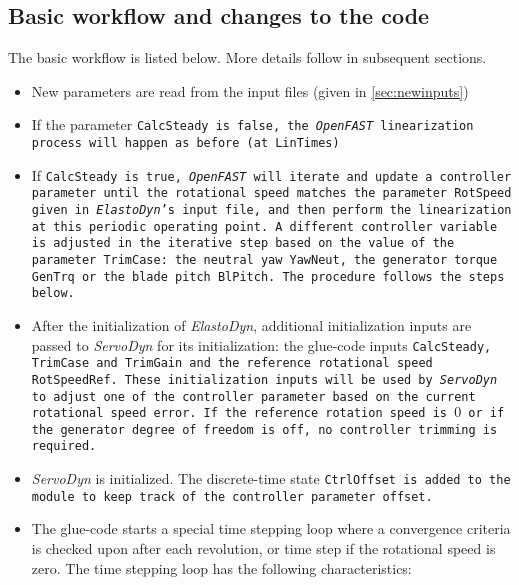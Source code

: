 \documentclass[11pt]{article}
\begin{document}
\subsection{Basic workflow and changes to the code}
The basic workflow is listed below. More details follow in subsequent sections.
\begin{itemize}\tightlist
    \item New parameters are read from the input files (given in \autoref{sec:newinputs})
    \item If the parameter \tt{CalcSteady} is false, the \textit{OpenFAST} linearization process will happen as before (at \tt{LinTimes})
    \item 
      If \tt{CalcSteady} is true, \textit{OpenFAST} will iterate and update a controller parameter
      until the rotational speed matches the parameter \tt{RotSpeed} given in \textit{ElastoDyn}'s input file, and then perform the linearization at this periodic operating point.
     A different controller variable is adjusted in the iterative step based on the value of the parameter \tt{TrimCase}: the neutral yaw \tt{YawNeut}, the generator torque \tt{GenTrq} or the blade pitch \tt{BlPitch}. 
     The procedure follows the steps below.
    \item After the initialization of \textit{ElastoDyn}, additional initialization inputs are passed to \textit{ServoDyn} for its initialization:  the glue-code inputs \tt{CalcSteady}, \tt{TrimCase} and \tt{TrimGain} and the reference rotational speed \tt{RotSpeedRef}. These initialization inputs will be used by \textit{ServoDyn} to adjust one of the controller parameter based on the current rotational speed error. If the reference rotation speed is $0$ or if the generator degree of freedom is off, no controller trimming is required. 
    \item \textit{ServoDyn} is initialized. The discrete-time state \tt{CtrlOffset} is added to the module to keep track of the controller parameter offset.
    \item The glue-code starts a special time stepping loop where a convergence criteria is checked upon after each revolution, or time step if the rotational speed is zero.  The time stepping loop has the following characteristics:
    \begin{itemize}\tightlist

\end{itemize}
\end{itemize}
\end{document}
